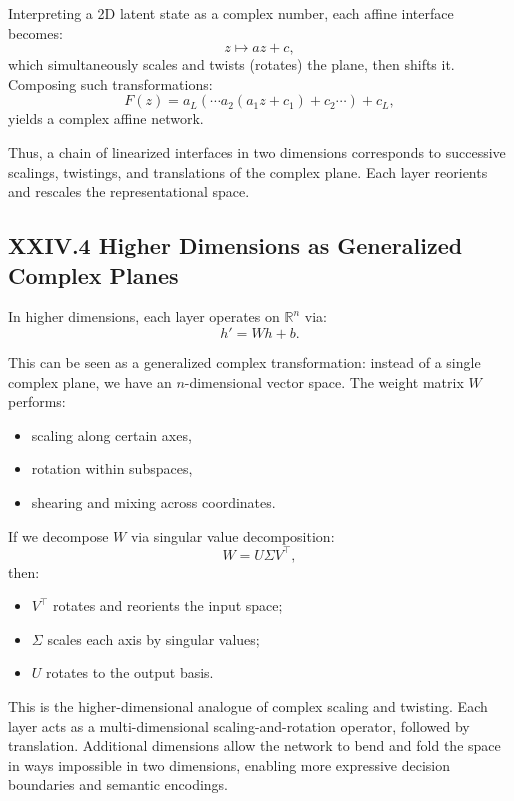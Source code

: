 \documentclass[11pt,letterpaper]{article}
\begin{document}
Interpreting a 2D latent state as a complex number, each affine interface becomes:
\[
z \mapsto a z + c,
\]
which simultaneously scales and twists (rotates) the plane, then shifts it. Composing such transformations:
\[
F(z) = a_L ( \cdots a_2 (a_1 z + c_1) + c_2 \cdots ) + c_L,
\]
yields a complex affine network.

Thus, a chain of linearized interfaces in two dimensions corresponds to successive scalings, twistings, and translations of the complex plane. Each layer reorients and rescales the representational space.

\subsection{XXIV.4 Higher Dimensions as Generalized Complex Planes}

In higher dimensions, each layer operates on $\mathbb{R}^n$ via:
\[
h' = W h + b.
\]

This can be seen as a generalized complex transformation: instead of a single complex plane, we have an $n$-dimensional vector space. The weight matrix $W$ performs:

\begin{itemize}
    \item scaling along certain axes,
    \item rotation within subspaces,
    \item shearing and mixing across coordinates.
\end{itemize}

If we decompose $W$ via singular value decomposition:
\[
W = U \Sigma V^\top,
\]
then:

\begin{itemize}
    \item $V^\top$ rotates and reorients the input space;
    \item $\Sigma$ scales each axis by singular values;
    \item $U$ rotates to the output basis.
\end{itemize}

This is the higher-dimensional analogue of complex scaling and twisting. Each layer acts as a multi-dimensional scaling-and-rotation operator, followed by translation. Additional dimensions allow the network to bend and fold the space in ways impossible in two dimensions, enabling more expressive decision boundaries and semantic encodings.
\end{document}
